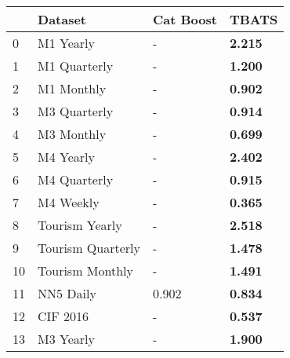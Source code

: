 \begin{tabular}{llll}
\toprule
 & Dataset & Cat Boost & TBATS \\
\midrule
0 & M1 Yearly & - & \textbf{2.215} \\
1 & M1 Quarterly & - & \textbf{1.200} \\
2 & M1 Monthly & - & \textbf{0.902} \\
3 & M3 Quarterly & - & \textbf{0.914} \\
4 & M3 Monthly & - & \textbf{0.699} \\
5 & M4 Yearly & - & \textbf{2.402} \\
6 & M4 Quarterly & - & \textbf{0.915} \\
7 & M4 Weekly & - & \textbf{0.365} \\
8 & Tourism Yearly & - & \textbf{2.518} \\
9 & Tourism Quarterly & - & \textbf{1.478} \\
10 & Tourism Monthly & - & \textbf{1.491} \\
11 & NN5 Daily & 0.902 & \textbf{0.834} \\
12 & CIF 2016 & - & \textbf{0.537} \\
13 & M3 Yearly & - & \textbf{1.900} \\
\bottomrule
\end{tabular}

